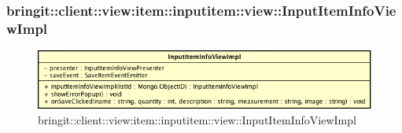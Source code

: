 \subsubsection{bringit::client::view:item::inputitem::view::InputItemInfoViewImpl}

\label{bringit::client::view:item::inputitem::view::InputItemInfoViewImpl}
\begin{figure}[H]
	\centering
	\includegraphics[scale=0.5]{Sezioni/SottosezioniST/img/app/InputItemInfoViewImpl.png}
	\caption{bringit::client::view:item::inputitem::view::InputItemInfoViewImpl}
\end{figure}

